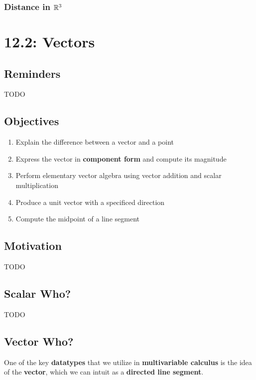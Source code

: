 \documentclass{report}
\begin{document}
\begin{sloppypar}
\subsection{Distance in $ \mathbb{R}^{3} $}
\begin{center}
\end{center}

\chapter{12.2: Vectors}
\section{Reminders}
TODO
\section{Objectives}
\begin{enumerate}
  \item Explain the difference between a vector
        and a point
  \item Express the vector in \textbf{component form}
        and compute its magnitude
  \item Perform elementary vector algebra using
        vector addition and scalar multiplication
  \item Produce a unit vector with a specificed
        direction
  \item Compute the midpoint of a line segment


\end{enumerate}
\section{Motivation}
TODO
\section{Scalar Who?}
TODO
\section{Vector Who?}
One of the key \textbf{datatypes} that we
utilize in \textbf{multivariable calculus} is the
idea of the \textbf{vector}, which we can
intuit as a \textbf{directed line segment}.
\begin{center}
\fbox{

}
\end{center}
\end{sloppypar}
\end{document}

